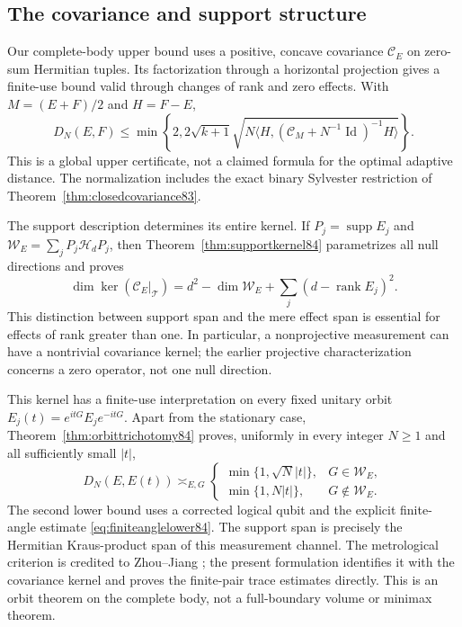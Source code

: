 \subsection{The covariance and support structure}
Our complete-body upper bound uses a positive, concave covariance
$\mathcal C_E$ on zero-sum Hermitian tuples.  Its factorization through
a horizontal projection gives a finite-use bound valid through changes
of rank and zero effects.  With $M=(E+F)/2$ and $H=F-E$,
\begin{equation}\label{eq:frontupper84}
 D_N(E,F)\le\min\left\{2,2\sqrt{k+1}
  \sqrt{N\langle H,(\mathcal C_M+N^{-1}\operatorname{Id})^{-1}H\rangle}
                              \right\}.
\end{equation}
This is a global upper certificate, not a claimed formula for the
optimal adaptive distance.  The normalization includes the exact
binary Sylvester restriction of Theorem~\ref{thm:closedcovariance83}.

The support description determines its entire kernel.  If
$P_j=\operatorname{supp}E_j$ and
$\mathcal W_E=\sum_jP_j\mathcal H_dP_j$, then
Theorem~\ref{thm:supportkernel84} parametrizes all null directions
and proves
\[
 \dim\ker(\mathcal C_E|_{\mathcal T})
 =d^2-\dim\mathcal W_E+\sum_j(d-\operatorname{rank}E_j)^2.
\]
This distinction between support span and the mere effect span is
essential for effects of rank greater than one.  In particular,
a nonprojective measurement can have a nontrivial covariance kernel;
the earlier projective characterization concerns a zero operator,
not one null direction.

This kernel has a finite-use interpretation on every fixed unitary
orbit $E_j(t)=e^{itG}E_je^{-itG}$.  Apart from the stationary case,
Theorem~\ref{thm:orbittrichotomy84} proves, uniformly in every integer
$N\ge1$ and all sufficiently small $|t|$,
\begin{equation}\label{eq:frontorbit84}
 D_N(E,E(t))\asymp_{E,G}
 \begin{cases}
 \min\{1,\sqrt N|t|\},&G\in\mathcal W_E,\\
 \min\{1,N|t|\},&G\notin\mathcal W_E.
 \end{cases}
\end{equation}
The second lower bound uses a corrected logical qubit and the explicit
finite-angle estimate \eqref{eq:finiteanglelower84}.
The support span is precisely the Hermitian Kraus-product span of
this measurement channel.  The metrological criterion is credited
to Zhou--Jiang \cite{ZJ84}; the present formulation identifies it
with the covariance kernel and proves the finite-pair trace estimates
directly.  This is an orbit theorem on the complete body, not a
full-boundary volume or minimax theorem.

